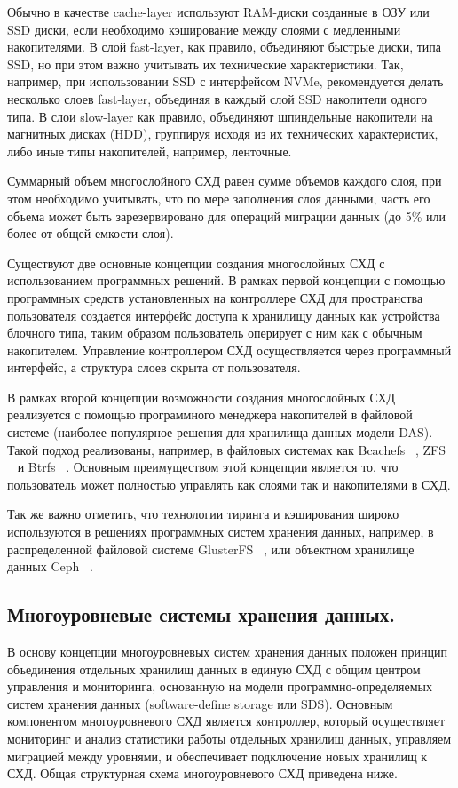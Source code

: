 \documentclass[10pt, a5paper]{article}
\begin{document}
Обычно в качестве cache-layer используют RAM-диски созданные в ОЗУ или SSD диски, если необходимо кэширование между  слоями с медленными накопителями. В слой fast-layer, как правило, объединяют быстрые диски, типа SSD, но при этом важно учитывать их технические характеристики. Так, например, при использовании SSD с интерфейсом  NVMe, рекомендуется делать несколько слоев  fast-layer, объединяя в каждый слой SSD накопители одного типа.  В слои slow-layer как правило, объединяют шпиндельные накопители на магнитных дисках (HDD), группируя исходя из их технических характеристик, либо иные типы накопителей, например, ленточные.

Суммарный объем многослойного СХД равен сумме объемов каждого слоя, при этом необходимо учитывать, что по мере заполнения слоя данными, часть его объема может быть зарезервировано для операций миграции данных (до 5\% или более от общей емкости слоя).

Существуют две основные концепции создания многослойных СХД с использованием программных решений.  В рамках первой концепции с помощью программных средств установленных на контроллере СХД для пространства пользователя создается интерфейс доступа к хранилищу данных как устройства блочного типа, таким образом пользователь оперирует с ним как с обычным накопителем. Управление контроллером СХД осуществляется через программный интерфейс, а структура слоев скрыта от пользователя.

В рамках второй концепции возможности создания многослойных СХД реализуется с помощью программного менеджера накопителей в файловой системе (наиболее популярное решения для  хранилища данных модели DAS). Такой подход реализованы, например, в файловых системах как Bcachefs ~\cite{kliga-3}, ZFS ~\cite{kliga-4} и Btrfs ~\cite{kliga-5}. Основным преимуществом этой концепции является то, что пользователь может полностью управлять как слоями так и накопителями в СХД.

Так же важно отметить, что технологии тиринга и кэширования широко  используются в решениях программных систем хранения данных, например, в распределенной файловой системе GlusterFS ~\cite{kliga-7}, или объектном хранилище данных Ceph ~\cite{kliga-6}.

\subsection*{Многоуровневые  системы хранения данных.}

В основу концепции многоуровневых систем хранения данных положен принцип объединения отдельных хранилищ данных в единую СХД с общим центром управления и мониторинга, основанную на модели программно-определяемых  систем хранения данных (software-define storage или SDS). Основным компонентом многоуровневого СХД является контроллер, который осуществляет мониторинг и анализ статистики работы отдельных хранилищ данных, управляем миграцией между уровнями, и обеспечивает подключение новых хранилищ к СХД.  Общая структурная схема многоуровневого СХД приведена ниже.
\end{document}
